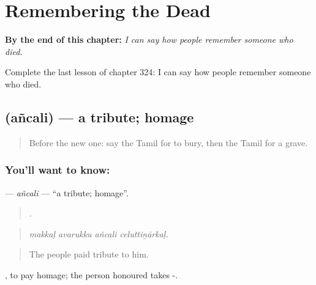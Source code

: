 
\chapter{Remembering the Dead}
\label{ch:ta-remembering-the-dead}

\begin{chapteropening}
\textbf{By the end of this chapter:} \emph{I can say how people remember someone who died.}

Complete the last lesson of chapter 324: I can say how people remember someone who died.
\end{chapteropening}

\section[\texorpdfstring{\ta{அஞ்சலி} (añcali)}{அஞ்சலி (añcali)}]{ (añcali) — a tribute; homage}

\label{lesson:TA-C324-ancali}



\begin{quote}
Before the new one: say the Tamil for to bury, then the Tamil for a grave.
\end{quote}

\subsection*{You'll want to know: }
\textbf{} — \emph{añcali} — \textquotedblleft{}a tribute; homage\textquotedblright{}.

\begin{quote}
   .
\end{quote}

\begin{quote}
\emph{makkaḷ avarukku añcali celuttiṉārkaḷ.}
\end{quote}

\begin{quote}
The people paid tribute to him.
\end{quote}

 , to pay homage; the person honoured takes -.

